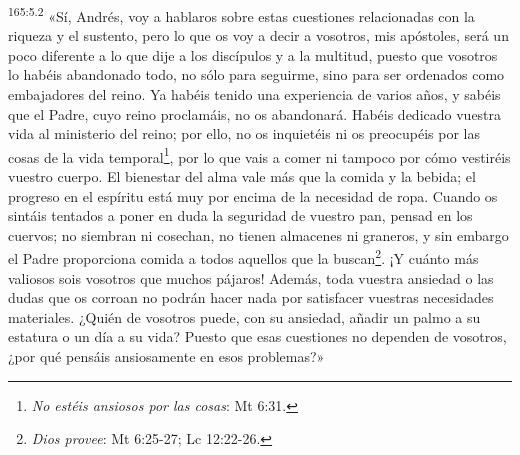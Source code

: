 \par
\textsuperscript{165:5.2} «Sí, Andrés, voy a hablaros sobre estas cuestiones relacionadas con la riqueza y el sustento, pero lo que os voy a decir a vosotros, mis apóstoles, será un poco diferente a lo que dije a los discípulos y a la multitud, puesto que vosotros lo habéis abandonado todo, no sólo para seguirme, sino para ser ordenados como embajadores del reino. Ya habéis tenido una experiencia de varios años, y sabéis que el Padre, cuyo reino proclamáis, no os abandonará. Habéis dedicado vuestra vida al ministerio del reino; por ello, no os inquietéis ni os preocupéis por las cosas de la vida temporal\footnote{\textit{No estéis ansiosos por las cosas}: Mt 6:31.}, por lo que vais a comer ni tampoco por cómo vestiréis vuestro cuerpo. El bienestar del alma vale más que la comida y la bebida; el progreso en el espíritu está muy por encima de la necesidad de ropa. Cuando os sintáis tentados a poner en duda la seguridad de vuestro pan, pensad en los cuervos; no siembran ni cosechan, no tienen almacenes ni graneros, y sin embargo el Padre proporciona comida a todos aquellos que la buscan\footnote{\textit{Dios provee}: Mt 6:25-27; Lc 12:22-26.}. ¡Y cuánto más valiosos sois vosotros que muchos pájaros! Además, toda vuestra ansiedad o las dudas que os corroan no podrán hacer nada por satisfacer vuestras necesidades materiales. ¿Quién de vosotros puede, con su ansiedad, añadir un palmo a su estatura o un día a su vida? Puesto que esas cuestiones no dependen de vosotros, ¿por qué pensáis ansiosamente en esos problemas?»

